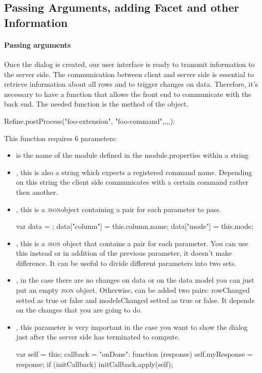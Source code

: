 \subsection{Passing Arguments, adding Facet and other Information}
\paragraph{Passing arguments} Once the dialog is created, our user interface is ready to transmit information to the server side. The communication between client and server side is essential to retrieve information about all rows and to trigger changes on data. Therefore, it's necessary to have a function that allows the front end to communicate with the back end. The needed function is the  method of the  object.
\begin{code}
Refine.postProcess("foo-extension", "foo-command",{},{},{},{});
\end{code}
This function requires 6 parameters:
\begin{itemize}
   \item {} is the name of the module defined in the module.properties within a string
   \item {}, this is also a string which expects a registered command name. Depending on this string the client side communicates with a certain command rather then another.
   \item {}, this is a \textsc{json}object containing a pair for each parameter to pass.
   \begin{code}
var data = { };   
data["column"] = this.column.name;
data["mode"] = this.mode;
	\end{code}
   \item {}, this is a \textsc{json} object that contains a pair for each parameter. You can use this instead or in addition of the previous parameter, it doesn't make difference. It can be useful to divide different parameters into two sets.
   \item {}, in the case there are no changes on data or on the data model you can just put an empty \textsc{json} object. Otherwise, can be added two pairs: rowChanged setted as true or false and modelsChanged setted as true or false. It depends on the changes that you are going to do.
   \item {}, this parameter is very important in the case you want to show the dialog just after the server side has terminated to compute.
\begin{code}
var self = this;
callback = { 
   "onDone": function (response) {
      self.myResponse = response;
      if (initCallback)
         initCallback.apply(self);
   }
}
\end{code}
\end{itemize}

